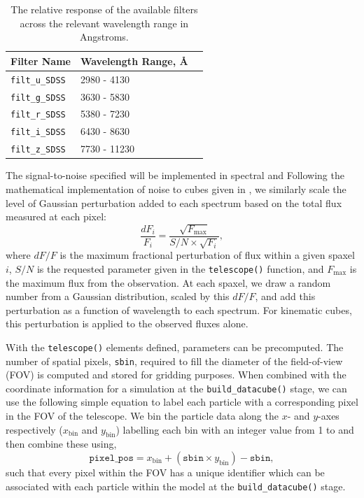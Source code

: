 \documentclass[
  journal=pasa,
  manuscript=research-paper, %
  year=2020,
  volume=37,
]{cup-journal}
\newcommand{\telescope}[1]{\texttt{telescope()}#1}
\newcommand{\builddatacube}[1]{\texttt{build\_datacube()}#1}
\begin{document}
\begin{table}[ht!]
\caption{The relative response of the available filters across the relevant wavelength range in Angstroms.}
\label{tab:available_filters}
\begin{tabular}{@{}lll@{}}
\toprule
\textbf{Filter Name} & \textbf{Wavelength Range, \AA}  \\ \midrule
\texttt{filt\_u\_SDSS} & 2980 - 4130 \\
\texttt{filt\_g\_SDSS} & 3630 - 5830 \\
\texttt{filt\_r\_SDSS} & 5380 - 7230 \\
\texttt{filt\_i\_SDSS} & 6430 - 8630 \\
\texttt{filt\_z\_SDSS} & 7730 - 11230 \\ \bottomrule
\end{tabular}
\end{table}

The signal-to-noise specified will be implemented in spectral and  Following the mathematical implementation of noise to cubes given in \citealt{Nanni2022iMaNGAcubes}, we similarly scale the level of Gaussian perturbation added to each spectrum based on the total flux measured at each pixel:
\begin{equation}
    \frac{dF_i}{F_i} = \frac{\sqrt{F_{\text{max}}}}{S/N \times \sqrt{F_i}},
\end{equation}
where $dF/F$ is the maximum fractional perturbation of flux within a given spaxel $i$, $S/N$ is the requested parameter given in the \telescope{} function, and $F_{\text{max}}$ is the maximum flux from the observation. 
At each spaxel, we draw a random number from a Gaussian distribution, scaled by this $dF/F$, and add this perturbation as a function of wavelength to each spectrum. 
For kinematic cubes, this perturbation is applied to the observed fluxes alone. 

With the \telescope{} elements defined, parameters can be precomputed. 
The number of spatial pixels, \texttt{sbin}, required to fill the diameter of the field-of-view (FOV) is computed and stored for gridding purposes. 
When combined with the coordinate information for a simulation at the \builddatacube{} stage, we can use the following simple equation to label each particle with a corresponding pixel in the FOV of the telescope. 
We bin the particle data along the $x$- and $y$-axes respectively ($x_{\text{bin}}$ and $y_{\text{bin}}$) labelling each bin with an integer value from 1 to  and then combine these using,
\begin{equation}
    \texttt{pixel\_pos} = x_{\text{bin}} + (\texttt{sbin} \times y_{\text{bin}}) - \texttt{sbin},
\end{equation}
such that every pixel within the FOV has a unique identifier which can be associated with each particle within the model at the \builddatacube{} stage.
\end{document}
